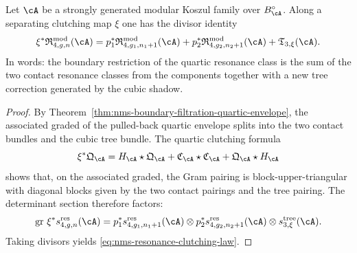 \begin{theorem}
\label{thm:nms-clutching-law-modular-resonance}
Let $\cA$ be a strongly generated modular Koszul family over $B_{\cA}^{\circ}$. Along a separating clutching map $\xi$ one has the divisor identity
\begin{equation}
\label{eq:nms-resonance-clutching-law}
\xi^*\mathfrak R_{4,g,n}^{\mathrm{mod}}(\cA)
=
p_1^*\mathfrak R_{4,g_1,n_1+1}^{\mathrm{mod}}(\cA)
+
p_2^*\mathfrak R_{4,g_2,n_2+1}^{\mathrm{mod}}(\cA)
+
\mathfrak T_{3,\xi}(\cA).
\end{equation}
In words: the boundary restriction of the quartic resonance class is the sum of the two contact resonance classes from the components together with a new tree correction generated by the cubic shadow.
\end{theorem}

\begin{proof}
By Theorem~\ref{thm:nms-boundary-filtration-quartic-envelope}, the associated graded of the pulled-back quartic envelope splits into the two contact bundles and the cubic tree bundle. The quartic clutching formula
\[
\xi^*\mathfrak Q_{\cA}
=
H_{\cA}\star\mathfrak Q_{\cA}
+
\mathfrak C_{\cA}\star\mathfrak C_{\cA}
+
\mathfrak Q_{\cA}\star H_{\cA}
\]
shows that, on the associated graded, the Gram pairing is block-upper-triangular with diagonal blocks given by the two contact pairings and the tree pairing. The determinant section therefore factors:
\[
\operatorname{gr}\,\xi^*s_{4,g,n}^{\mathrm{res}}(\cA)
=
p_1^*s_{4,g_1,n_1+1}^{\mathrm{res}}(\cA)
\otimes
p_2^*s_{4,g_2,n_2+1}^{\mathrm{res}}(\cA)
\otimes
s_{3,\xi}^{\mathrm{tree}}(\cA).
\]
Taking divisors yields \eqref{eq:nms-resonance-clutching-law}.\qedhere
\end{proof}

